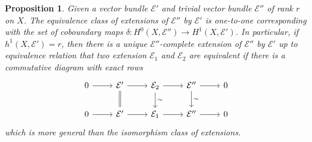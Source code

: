 \documentclass{ctexart}
\newtheorem{proposition}{Proposition}[section]
\begin{document}
\begin{proposition}
    Given a vector bundle $\mathcal{E}'$ and trivial vector bundle $\mathcal{E}''$ of rank $r$ on $X$.
    The equivalence class of extensions of $\mathcal{E}''$ by $\mathcal{E}'$ is one-to-one corresponding with the set of coboundary maps $\delta: H^{0}(X, \mathcal{E}'') \to H^{1}(X, \mathcal{E}')$.
    In particular, if $h^{1}(X, \mathcal{E}') = r$, then there is a unique $\mathcal{E}''$-complete extension of $\mathcal{E}''$ by $\mathcal{E}'$ up to equivalence relation that two extension $\mathcal{E}_{1}$ and $\mathcal{E}_{2}$ are equivalent if there is a commutative diagram with exact rows
    \begin{equation}
        \begin{tikzcd}
            0 \arrow[r] &
            \mathcal{E}' \arrow[r] \arrow[d, equal] &
            \mathcal{E}_{2} \arrow[r] \arrow[d, "\sim"] &
            \mathcal{E}'' \arrow[r] \arrow[d, "\sim"] &
            0 \\
            0 \arrow[r] &
            \mathcal{E}' \arrow[r] &
            \mathcal{E}_{1} \arrow[r] &
            \mathcal{E}'' \arrow[r] &
            0
        \end{tikzcd}
    \end{equation}
    which is more general than the isomorphism class of extensions.
    \label{Proposition 5.3}
\end{proposition}
\end{document}
